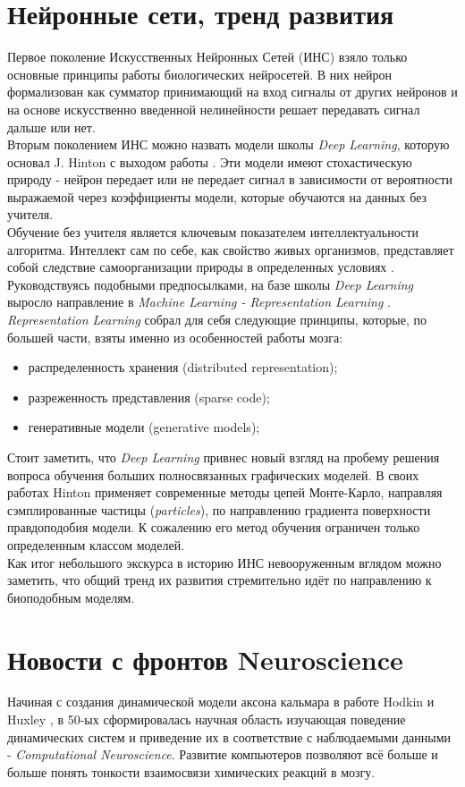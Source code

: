 \documentclass[a4paper,10pt]{article}
\begin{document}
\section{Нейронные сети, тренд развития}
Первое поколение Искусственных Нейронных Сетей (ИНС) взяло только основные принципы работы биологических нейросетей. В них нейрон формализован как сумматор принимающий на вход сигналы от других нейронов и на основе искусственно введенной нелинейности решает передавать сигнал дальше или нет.\\
\indent Вторым поколением ИНС можно назвать модели школы \textit{Deep Learning}, которую основал J. Hinton с выходом работы \cite{hinton2006}. Эти модели имеют стохастическую природу - нейрон передает или не передает сигнал в зависимости от вероятности выражаемой через коэффициенты модели, которые обучаются на данных без учителя.\\ 
\indent Обучение без учителя является ключевым показателем интеллектуальности алгоритма. Интеллект сам по себе, как свойство живых организмов, представляет собой следствие самоорганизации природы в определенных условиях \cite{evolut}. Руководствуясь подобными предпосылками, на базе школы \textit{Deep Learning} выросло направление в \textit{Machine Learning - Representation Learning} \cite{yoshua}.\\
\indent \textit{Representation Learning} собрал для себя следующие принципы, которые, по большей части, взяты именно из особенностей работы мозга:
\begin{itemize}
\item распределенность хранения (distributed representation);
\item разреженность представления (sparse code);
\item генеративные модели (generative models);
\end{itemize} 
\indent \indent Стоит заметить, что \textit{Deep Learning} привнес новый взгляд на пробему решения вопроса обучения больших полносвязанных графических моделей. В своих работах Hinton применяет современные методы цепей Монте-Карло, направляя сэмплированные частицы (\textit{particles}), по направлению градиента поверхности правдоподобия модели. К сожалению его метод обучения ограничен только определенным классом моделей.\\
\indent Как итог небольшого экскурса в историю ИНС невооруженным вглядом можно заметить, что общий тренд их развития стремительно идёт по направлению к биоподобным моделям.
\section{Новости с фронтов Neuroscience}
Начиная с создания динамической модели аксона кальмара в работе Hodkin и Huxley \cite{hodhux}, в 50-ых сформировалась научная область изучающая поведение динамических систем и приведение их в соответствие с наблюдаемыми данными - \textit{Computational Neuroscience}. Развитие компьютеров позволяют всё больше и больше понять тонкости взаимосвязи химических реакций в мозгу.\\ 
\end{document}

